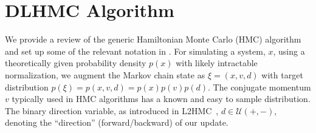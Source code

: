 \documentclass{article} %
\begin{document}
%
%
%
\section{\label{sec:method}DLHMC Algorithm}
%
We provide a review of the generic Hamiltonian Monte Carlo (HMC) algorithm and set up some of the relevant notation in
.
%
For simulating a system, $x$, using a theoretically given probability density $p(x)$ with likely intractable
normalization, we augment the Markov chain state as \(\xi = (x, v, d)\) with target distribution \(p(\xi) = p(x, v, d) =
p(x) p(v) p(d)\).
%
The conjugate momentum $v$ typically used in HMC algorithms has a known and easy to sample distribution.
%
The binary direction variable, as introduced in L2HMC~\citep{levy2017}, \(d\in\mathcal{U}(+,-)\), denoting the
``direction'' (forward/backward) of our update.
%
\end{document}
